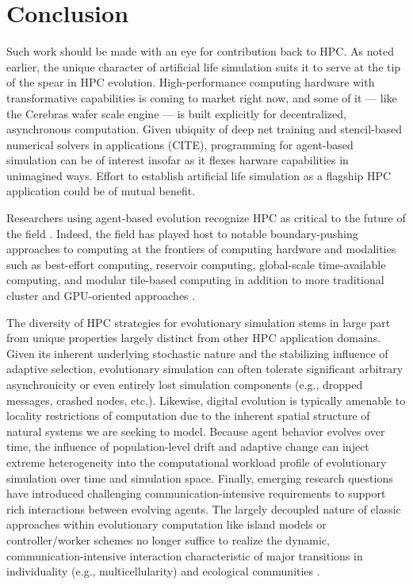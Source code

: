 \section{Conclusion} \label{sec:conclusion}


Such work should be made with an eye for contribution back to HPC.
As noted earlier, the unique character of artificial life simulation suits it to serve at the tip of the spear in HPC evolution.
High-performance computing hardware with transformative capabilities is coming to market right now, and some of it --- like the Cerebras wafer scale engine \citep{lauterbach2021path} --- is built explicitly for decentralized, asynchronous computation.
Given ubiquity of deep net training and stencil-based numerical solvers in applications (CITE), programming for agent-based simulation can be of interest insofar as it flexes harware capabilities in unimagined ways.
Effort to establish artificial life simulation as a flagship HPC application could be of mutual benefit.

Researchers using agent-based evolution recognize HPC as critical to the future of the field \citep{ackley2016indefinite}.
Indeed, the field has played host to notable boundary-pushing approaches to computing at the frontiers of computing hardware and modalities such as best-effort computing, reservoir computing, global-scale time-available computing, and modular tile-based computing in addition to more traditional cluster and GPU-oriented approaches \citep{moreno2021conduit,ackley2020best,ackley2023robust,heinemann2008artificial,miikkulainen2024evolving}.

The diversity of HPC strategies for evolutionary simulation stems in large part from unique properties largely distinct from other HPC application domains.
Given its inherent underlying stochastic nature and the stabilizing influence of adaptive selection, evolutionary simulation can often tolerate significant arbitrary asynchronicity or even entirely lost simulation components (e.g., dropped messages, crashed nodes, etc.).
Likewise, digital evolution is typically amenable to locality restrictions of computation due to the inherent spatial structure of natural systems we are seeking to model.
Because agent behavior evolves over time, the influence of population-level drift and adaptive change can inject extreme heterogeneity into the computational workload profile of evolutionary simulation over time and simulation space.
Finally, emerging research questions have introduced challenging communication-intensive requirements to support rich interactions between evolving agents.
The largely decoupled nature of classic approaches within evolutionary computation like island models or controller/worker schemes  \citep{bennett1999building,cantu2001master} no longer suffice to realize the dynamic, communication-intensive interaction characteristic of major transitions in individuality (e.g., multicellularity) and ecological communities \citep{moreno2022engineering}.


